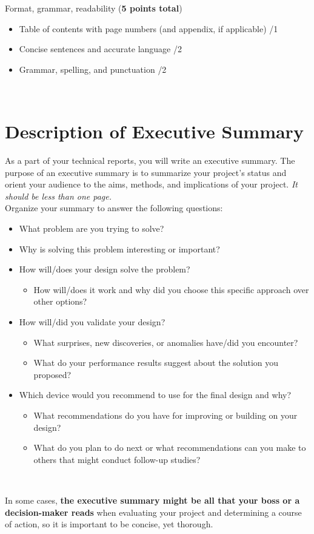 \documentclass{article}
\begin{document}
Format, grammar, readability (\textbf{5 points total})
\begin{small}
\begin{itemize}
	\item Table of contents with page numbers (and appendix, if applicable) \hfill \underline{\hspace{1cm}}/1
	\item Concise sentences and accurate language \hfill \underline{\hspace{1cm}}/2
	\item Grammar, spelling, and punctuation \hfill \underline{\hspace{1cm}}/2
\end{itemize}
\end{small}\
\pagebreak

\section*{Description of Executive Summary}
As a part of your technical reports, you will write an executive summary. The purpose of an executive summary is to summarize your project’s status and orient your audience to the aims, methods, and implications of your project. \textit{It should be less than one page.}\\

Organize your summary to answer the following questions:
\begin{itemize}
	\item What problem are you trying to solve?
	\item Why is solving this problem interesting or important?
	\item How will/does your design solve the problem?
	\begin{itemize}
		\item How will/does it work and why did you choose this specific approach over other options?
	\end{itemize}
	\item How will/did you validate your design?
	\begin{itemize}
		\item What surprises, new discoveries, or anomalies have/did you encounter?
		\item What do your performance results suggest about the solution you proposed?
	\end{itemize}
	\item Which device would you recommend to use for the final design and why?
	\begin{itemize}
		\item What recommendations do you have for improving or building on your design?
		\item What do you plan to do next or what recommendations can you make to others that might conduct follow-up studies?
	\end{itemize}
\end{itemize}\

In some cases, \textbf{the executive summary might be all that your boss or a decision-maker reads} when evaluating your project and determining a course of action, so it is important to be concise, yet thorough.
\end{document}
